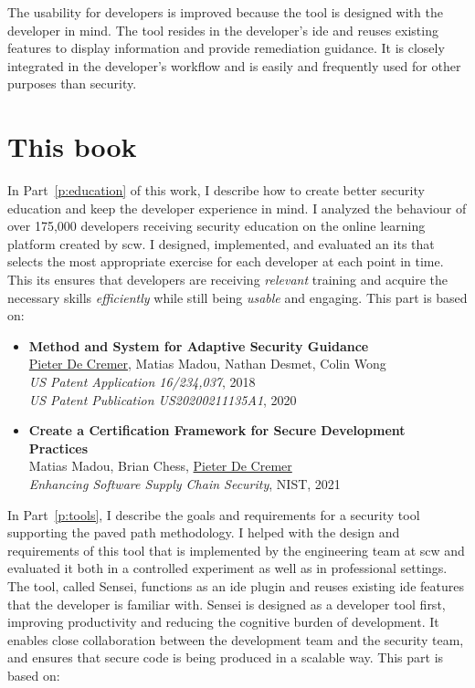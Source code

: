 The usability for developers is improved because the tool is designed with the developer in mind.  
The tool resides in the developer's \gls{ide} and reuses existing features to display information and provide remediation guidance.
It is closely integrated in the developer's workflow and is easily and frequently used for other purposes than security.

\section{This book}

In Part~\ref{p:education} of this work, I describe how to create better security education and keep the developer experience in mind.
I analyzed the behaviour of over 175,000 developers receiving security education on the online learning platform created by \gls{scw}. 
I designed, implemented, and evaluated an \gls{its} that selects the most appropriate exercise for each developer at each point in time.
This \gls{its} ensures that developers are receiving \textit{relevant} training and acquire the necessary skills \textit{efficiently} while still being \textit{usable} and engaging.
This part is based on:

\begin{itemize}
    \item 
    \textbf{Method and System for Adaptive Security Guidance}\\
    \underline{Pieter De Cremer}, Matias Madou, Nathan Desmet, Colin Wong\\
    \emph{US Patent Application 16/234,037}, 2018\\
    \emph{US Patent Publication US20200211135A1}, 2020
    \item 
    \textbf{Create a Certification Framework for Secure Development Practices}\\
    Matias Madou, Brian Chess, \underline{Pieter De Cremer}\\
    \emph{Enhancing Software Supply Chain Security}, NIST, 2021
\end{itemize}

In Part~\ref{p:tools}, I describe the goals and requirements for a security tool supporting the paved path methodology.
I helped with the design and requirements of this tool that is implemented by the engineering team at \gls{scw} and evaluated it both in a controlled experiment as well as in professional settings.
The tool, called Sensei, functions as an \gls{ide} plugin and reuses existing \gls{ide} features that the developer is familiar with.
Sensei is designed as a developer tool first, improving productivity and reducing the cognitive burden of development.
It enables close collaboration between the development team and the security team, and ensures that secure code is being produced in a scalable way.
This part is based on:

